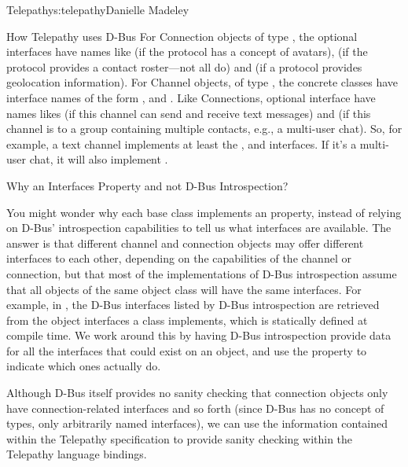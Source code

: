 \begin{aosachapter}{Telepathy}{s:telepathy}{Danielle Madeley}
\begin{aosasect1}{How Telepathy uses D-Bus}
For Connection objects of type , the optional
interfaces have names like 
(if the protocol has a concept of avatars),
 (if the protocol provides
a contact roster---not all do) and
 (if a protocol provides
geolocation information).  For Channel objects, of type
, the concrete classes have interface names of the
form ,  and
. Like Connections, optional
interface have names likes  (if
this channel can send and receive text messages) and
 (if this channel is to a group
containing multiple contacts, e.g., a multi-user chat).  So, for
example, a text channel implements at least the ,
 and 
interfaces.  If it's a multi-user chat, it will also implement
.

\begin{aosabox}{Why an Interfaces Property and not D-Bus Introspection?}

You might wonder why each base class implements an 
property, instead of relying on D-Bus' introspection capabilities to
tell us what interfaces are available.  The answer is that different
channel and connection objects may offer different interfaces to each
other, depending on the capabilities of the channel or connection, but
that most of the implementations of D-Bus introspection assume that
all objects of the same object class will have the same interfaces.
For example, in , the D-Bus interfaces listed by
D-Bus introspection are retrieved from the object interfaces a class
implements, which is statically defined at compile time.  We work
around this by having D-Bus introspection provide data for all the
interfaces that could exist on an object, and use the
 property to indicate which ones actually do.

\end{aosabox}

Although D-Bus itself provides no sanity checking that connection
objects only have connection-related interfaces and so forth (since
D-Bus has no concept of types, only arbitrarily named interfaces), we
can use the information contained within the Telepathy specification
to provide sanity checking within the Telepathy language bindings.


\end{aosasect1}
\end{aosachapter}
